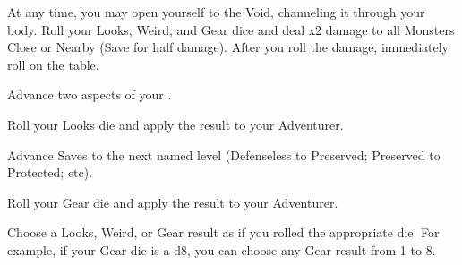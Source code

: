 \begin{multicols*}{2}


At any time, you may open yourself to the Void, channeling it through your body. Roll your Looks, Weird, and Gear dice and deal \SUM x2 damage to all Monsters Close or Nearby (Save for half damage). After you roll the damage, immediately roll on the  table.


Advance two  aspects of your  \DCUP. 



Roll your Looks die and apply the result to your Adventurer.

\cbreak


Advance  Saves to the next named level (Defenseless to Preserved; Preserved to Protected; etc). 


Roll your Gear die and apply the result to your Adventurer.


Choose a Looks, Weird, or Gear result as if you rolled the appropriate die.  For example, if your Gear die is a d8, you can choose any Gear result from 1 to 8.

\end{multicols*}
